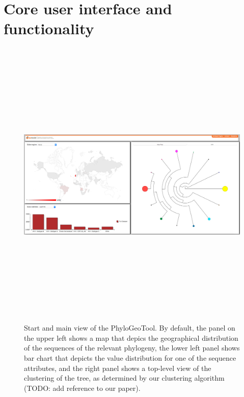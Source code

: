 \documentclass[a4paper, 11pt]{article} %
\begin{document}
\section{Core user interface and functionality}




\begin{figure}[H]
\centering
\includegraphics[width=400pt, height=400pt, keepaspectratio=true]{images/initial_view.PNG}
\caption{Start and main view of the PhyloGeoTool. By default, the panel on the upper left shows a map that depics the geographical distribution of the sequences of the relevant phylogeny, the lower left panel shows bar chart that depicts the value distribution for one of the sequence attributes, and the right panel shows a top-level view of the clustering of the tree, as determined by our clustering algorithm (TODO: add reference to our paper).}
\label{fig:initial_view}
\end{figure}
\end{document}
